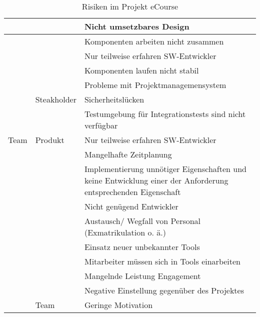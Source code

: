 \begin{table}
\begin{tabularx}{\textwidth}{|l|l|X|}
\hline
 &  & Nicht umsetzbares Design  \\ 
\hline
 &  & Komponenten arbeiten nicht zusammen\\ 
\hline
 &  & Nur teilweise erfahren SW-Entwickler  \\ 
\hline
 &  & Komponenten laufen nicht stabil  \\ 
\hline
 &  & Probleme mit Projektmanagemensystem \\ 
\hline
 & Steakholder & Sicherheitslücken\\ 
\hline
 &  & Testumgebung für Integrationstests sind nicht verfügbar  \\ 
\hline
Team & Produkt & Nur teilweise erfahren SW-Entwickler  \\ 
\hline
 &  & Mangelhafte Zeitplanung   \\ 
\hline
 &  & Implementierung unnötiger Eigenschaften und keine Entwicklung einer der Anforderung entsprechenden Eigenschaft  \\ 
\hline
 &  & Nicht genügend Entwickler  \\ 
\hline
 &  & Austausch/ Wegfall von Personal (Exmatrikulation o. ä.)   \\ 
\hline
 &  & Einsatz neuer unbekannter Tools  \\ 
\hline
 &  & Mitarbeiter müssen sich in Tools einarbeiten  \\ 
\hline
 &  & Mangelnde Leistung Engagement  \\ 
\hline
 &  & Negative Einstellung gegenüber des Projektes  \\ 
\hline
 & Team & Geringe Motivation\\ 
\hline
\end{tabularx}
\caption{Risiken im Projekt eCourse}
\label{tab:Risiken}
\end{table}